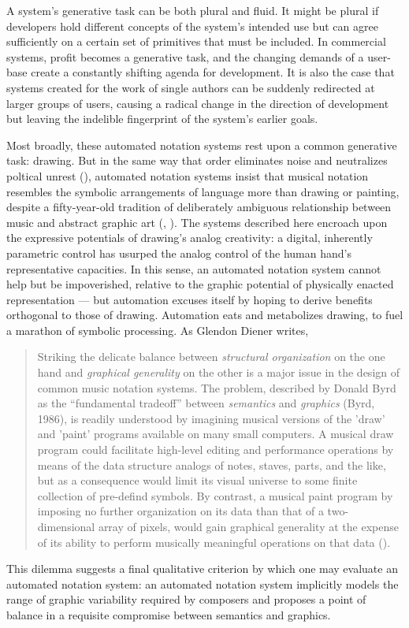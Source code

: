 A system's generative task can be both plural and fluid. It might be plural if developers hold different concepts of the system's intended use but can agree sufficiently on a certain set of primitives that must be included. In commercial systems, profit becomes a generative task, and the changing demands of a user-base create a constantly shifting agenda for development. It is also the case that systems created for the work of single authors can be suddenly redirected at larger groups of users, causing a radical change in the direction of development but leaving the indelible fingerprint of the system's earlier goals.

Most broadly, these automated notation systems rest upon a common generative task: drawing. But in the same way that order eliminates noise and neutralizes poltical unrest (\cite{Attali:1985ss}), automated notation systems insist that musical notation resembles the symbolic arrangements of language more than drawing or painting, despite a fifty-year-old tradition of deliberately ambiguous relationship between music and abstract graphic art (\cite{Evarts:1968ff}, \cite{Cardew:1961lh}). The systems described here encroach upon the expressive potentials of drawing's analog creativity: a digital, inherently parametric control has usurped the analog control of the human hand's representative capacities. In this sense, an automated notation system cannot help but be impoverished, relative to the graphic potential of physically enacted representation --- but automation excuses itself by hoping to derive benefits orthogonal to those of drawing. Automation eats and metabolizes drawing, to fuel a marathon of symbolic processing. As Glendon Diener writes, 

\begin{quote} Striking the delicate balance between \emph{structural organization} on the one hand and \emph{graphical generality} on the other is a major issue in the design of common music notation systems. The problem, described by Donald Byrd as the ``fundamental tradeoff'' between \emph{semantics} and \emph{graphics} (Byrd, 1986), is readily understood by imagining musical versions of the 'draw' and 'paint' programs available on many small computers. A musical draw program could facilitate high-level editing and performance operations by means of the data structure analogs of notes, staves, parts, and the like, but as a consequence would limit its visual universe to some finite collection of pre-defind symbols. By contrast, a musical paint program by imposing no further organization on its data than that of a two-dimensional array of pixels, would gain graphical generality at the expense of its ability to perform musically meaningful operations on that data (\cite{Diener:1989ve}).\end{quote}

This dilemma suggests a final qualitative criterion by which one may evaluate an automated notation system: an automated notation system implicitly models the range of graphic variability required by composers and proposes a point of balance in a requisite compromise between semantics and graphics.
